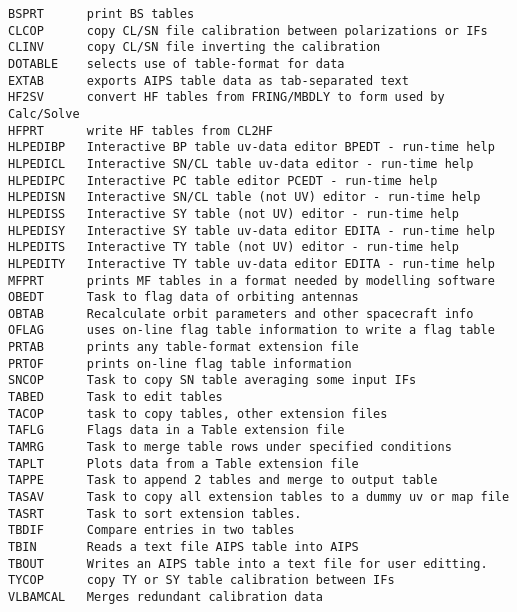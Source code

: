 \vskip 0.5pt
\bbve\begin{verbatim}
BSPRT      print BS tables
CLCOP      copy CL/SN file calibration between polarizations or IFs
CLINV      copy CL/SN file inverting the calibration
DOTABLE    selects use of table-format for data
EXTAB      exports AIPS table data as tab-separated text
HF2SV      convert HF tables from FRING/MBDLY to form used by Calc/Solve
HFPRT      write HF tables from CL2HF
HLPEDIBP   Interactive BP table uv-data editor BPEDT - run-time help
HLPEDICL   Interactive SN/CL table uv-data editor - run-time help
HLPEDIPC   Interactive PC table editor PCEDT - run-time help
HLPEDISN   Interactive SN/CL table (not UV) editor - run-time help
HLPEDISS   Interactive SY table (not UV) editor - run-time help
HLPEDISY   Interactive SY table uv-data editor EDITA - run-time help
HLPEDITS   Interactive TY table (not UV) editor - run-time help
HLPEDITY   Interactive TY table uv-data editor EDITA - run-time help
MFPRT      prints MF tables in a format needed by modelling software
OBEDT      Task to flag data of orbiting antennas
OBTAB      Recalculate orbit parameters and other spacecraft info
OFLAG      uses on-line flag table information to write a flag table
PRTAB      prints any table-format extension file
PRTOF      prints on-line flag table information
SNCOP      Task to copy SN table averaging some input IFs
TABED      Task to edit tables
TACOP      task to copy tables, other extension files
TAFLG      Flags data in a Table extension file
TAMRG      Task to merge table rows under specified conditions
TAPLT      Plots data from a Table extension file
TAPPE      Task to append 2 tables and merge to output table
TASAV      Task to copy all extension tables to a dummy uv or map file
TASRT      Task to sort extension tables.
TBDIF      Compare entries in two tables
TBIN       Reads a text file AIPS table into AIPS
TBOUT      Writes an AIPS table into a text file for user editting.
TYCOP      copy TY or SY table calibration between IFs
VLBAMCAL   Merges redundant calibration data
\end{verbatim}\eve


